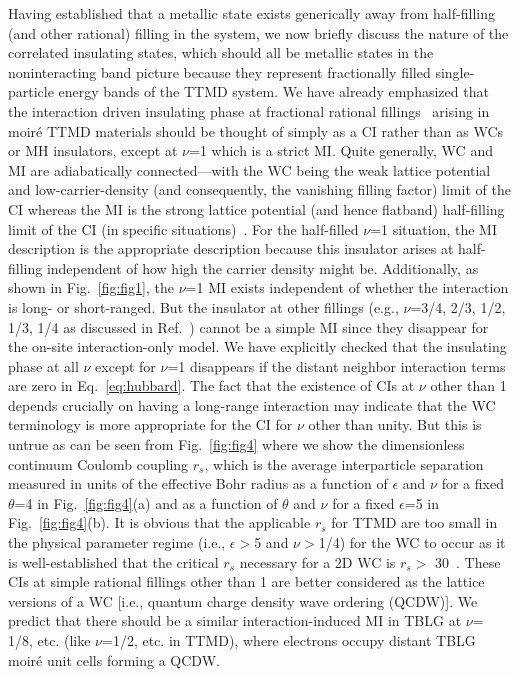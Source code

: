 \documentclass[aps,prl,floatfix,twocolumn]{revtex4-2}
\begin{document}
{Having established that a metallic state exists generically away from half-filling (and other rational) filling in the system, we now briefly discuss the nature of the correlated insulating states, which should all be metallic states in the noninteracting band picture because they represent fractionally filled single-particle energy bands of the TTMD system.} We have already emphasized that the interaction driven insulating phase {at fractional rational fillings}~\cite{pan2020band,pan2020quantum} arising in moir\'e TTMD materials should be thought of simply as a {CI} rather than as {WCs} or {MH} insulators, except at $ \nu$=1 which is a strict MI. {Quite generally, WC and MI are adiabatically connected—with the WC being the weak lattice potential and low-carrier-density (and consequently, the vanishing filling factor) limit of the {CI} whereas the MI is the strong lattice potential (and hence flatband) half-filling limit of the {CI} (in specific situations)~\cite{vu2020collective}.}
For the half-filled $\nu$=1 situation, the MI description is the appropriate description because this insulator arises at half-filling independent of how high the carrier density might be. {Additionally}, as shown in Fig.~\ref{fig:fig1}, the $\nu$=1 {MI} exists independent of whether the interaction is {long- or short-ranged}.  But the insulator at other fillings (e.g., $\nu$=3/4, 2/3, 1/2, 1/3, 1/4 as discussed in Ref.~) cannot be a simple MI since they {disappear} for the on-site interaction-only model. We have explicitly checked that the insulating phase at {all $\nu$ except for $ \nu $=1} disappears if the distant neighbor interaction terms are {zero} in Eq.~\eqref{eq:hubbard}.  The fact that the existence of {CIs} at $\nu$ {other than 1} depends crucially on having a long-range interaction may indicate that the WC terminology is more appropriate for the {CI} for $\nu$ other than unity.  But this is {untrue} as can be seen from Fig.~\ref{fig:fig4} where we show the dimensionless continuum Coulomb coupling $r_s$, which is the average interparticle separation measured in units of the effective {Bohr radius as a function} of $\epsilon$ and $\nu$ for a {fixed} $\theta$=4 in Fig.~\ref{fig:fig4}(a) and as a function of $ \theta $ and $ \nu $ for a fixed $ \epsilon $=5 in Fig.~\ref{fig:fig4}(b).  {It is obvious} that the applicable $r_s$ {for TTMD are too small} in the physical parameter regime (i.e., $\epsilon>$5 and $\nu>$1/4) for the WC to occur as it is well-established that the critical $r_s$ necessary for a 2D WC is $ r_s> $ 30~\cite{drummond2009phase}. {These} {CIs} at simple rational fillings other than 1 are better {considered} as the lattice versions of a WC [i.e., quantum charge density wave ordering (QCDW)]. We predict that there should be a similar interaction-induced {MI} {in TBLG at $ \nu $= 1/8}, etc. ({like} $ \nu $=1/2, etc. in TTMD), where electrons occupy distant TBLG moir\'e unit cells forming a {QCDW}.
\end{document}
